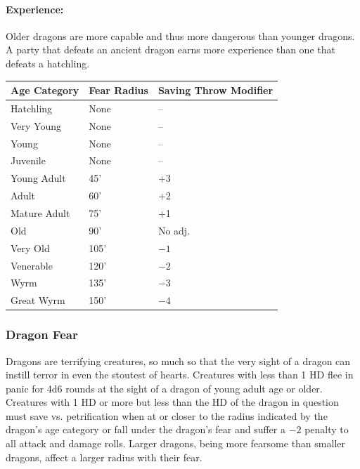 \begin{multicols}{2}



\paragraph{Experience:} Older dragons are more capable and thus more dangerous than younger dragons. A party that defeats an ancient dragon earns more experience than one that defeats a hatchling.

\noindent \begin{minipage}{\columnwidth}

\label{dragonfear}
\noindent \begin{tabular}{|p{}|p{}|p{}|}
\hline
Age Category	& Fear Radius	& Saving Throw Modifier	\\
\hline\hline
\rowcolor[gray]{.9}Hatchling	& None	& --	\\
Very Young	& None	& --	\\
\rowcolor[gray]{.9}Young		& None	& --	\\
Juvenile	& None	& --	\\
\rowcolor[gray]{.9}Young Adult	& 45'		& +3	\\
Adult		& 60'		& +2	\\
\rowcolor[gray]{.9}Mature Adult	& 75'		& +1	\\
Old			& 90'		& No adj.	\\
\rowcolor[gray]{.9}Very Old	& 105'	& $-1$	\\
Venerable	& 120'	& $-2$	\\
\rowcolor[gray]{.9}Wyrm		& 135'	& $-3$	\\
Great Wyrm	& 150'	& $-4$	\\
\hline
\end{tabular}

\end{minipage}

\subsubsection*{Dragon Fear}

Dragons are terrifying creatures, so much so that the very sight of a dragon can instill terror in even the stoutest of hearts. Creatures with less than 1 HD flee in panic for 4d6 rounds at the sight of a dragon of young adult age or older. Creatures with 1 HD or more but less than the HD of the dragon in question must save vs. petrification when at or closer to the radius indicated by the dragon's age category or fall under the dragon's fear and suffer a $-2$ penalty to all attack and damage rolls. Larger dragons, being more fearsome than smaller dragons, affect a larger radius with their fear.


\end{multicols}
